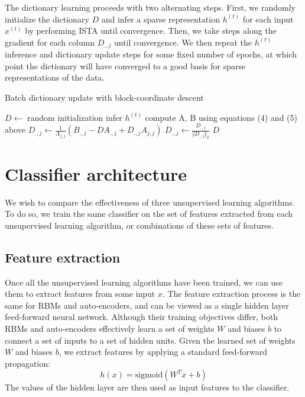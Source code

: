 \documentclass{article} %
\begin{document}
The dictionary learning proceeds with two alternating steps. First, we randomly initialize the dictionary $D$ and infer a sparse representation $h^{(t)}$ for each input $x^{(t)}$ by performing ISTA until convergence. Then, we take steps along the gradient for each column $D_{.,j}$ until convergence. We then repeat the $h^{(t)}$ inference and dictionary update steps for some fixed number of epochs, at which point the dictionary will have converged to a good basis for sparse representations of the data.


\begin{algorithm}
\caption{Batch dictionary update with block-coordinate descent}
\begin{algorithmic}[1]
\State $D\gets$ random initialization
		\State infer $h^{(t)}$ 
	\EndFor
	\State compute A, B using equations (4) and (5) above
			\State $D_{.,j}\gets \frac{1}{A_{j,j}} (B_{.,j} - D A_{.,j} + D_{.,j} A_{j,j})$
			\State $D_{.,j}\gets \frac{D_{.,j}}{\Vert D_{.,j} \Vert_2}$ 
		\EndFor
	\EndWhile
\EndWhile
\State\Return $D$
\end{algorithmic}
\end{algorithm}

\section{Classifier architecture}
We wish to compare the effectiveness of three unsupervised learning algorithms. To do so, we train the same classifier on the set of features extracted from each unsupervised learning algorithm, or combinations of these sets of features.

\subsection{Feature extraction}
Once all the unsupervised learning algorithms have been trained, we can use them to extract features from some input $x$. The feature extraction process is the same for RBMs and auto-encoders, and can be viewed as a single hidden layer feed-forward neural network. Although their training objectives differ, both RBMs and auto-encoders effectively learn a set of weights $W$ and biases $b$ to connect a set of inputs to a set of hidden units. Given the learned set of weights $W$ and biases $b$, we extract features by applying a standard feed-forward propagation:
\begin{equation}
h(x) = \text{sigmoid}(W^T x + b)
\end{equation}
The values of the hidden layer are then used as input features to the classifier.
\end{document}
